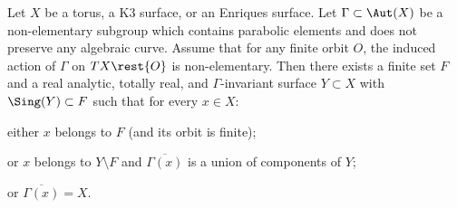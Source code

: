\begin{thm}\label{thm:orbit_closures}
Let $X$ be a torus, a K3 surface, or an Enriques surface.
Let $\Gamma\subset \Aut(X)$ be a non-elementary subgroup which contains parabolic elements and does not
preserve any algebraic curve. Assume
that for any finite orbit $O$, the induced action of $\Gamma$ on $TX\rest{O}$ is non-elementary.
Then there exists a finite set $F$ and a real analytic,
totally real, and $\Gamma$-invariant surface $Y \subset X$ with $\Sing(Y)\subset F$
such that for every $x\in X$:
\begin{enumeratea}
\item\label{thm:orbit_closuresa} either $x$ belongs to $F$ (and its orbit is finite);
\item\label{thm:orbit_closuresb} or $x$ belongs to $Y\setminus F$ and $\overline{ \Gamma (x)}$ is a union of components of $Y$;
\item\label{thm:orbit_closuresc} or $\overline{ \Gamma (x)} =X$.
\end{enumeratea}
\end{thm}

